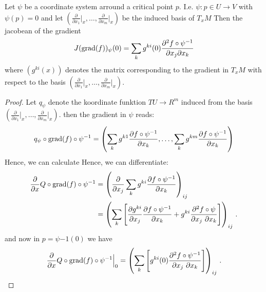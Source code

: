 \begin{lemma}
	Let $\psi$ be a coordinate system arround a critical point $p$. I.e. $\psi: p\in U\to V$ with $\psi(p)=0$ and let $\left( \frac{\partial}{\partial x_1}\big|_x,\dots ,\frac{\partial}{\partial x_m}\big|_x\right)$ be the induced basis of $T_xM$ Then the jacobean of the gradient 
	\begin{equation}
			J(\mathrm{grad}(f))_\psi(0)= \sum_{k}g^{ki}(0)\frac{\partial ^2 f\circ \psi^{-1} }{\partial x_j \partial x_k}
	\end{equation} where $(g^{ki}(x))$ denotes the matrix corresponding to the gradient in $T_xM$ with respect to the basis $\left( \frac{\partial}{\partial x_1}\big|_x,\dots ,\frac{\partial}{\partial x_m}\big|_x\right)$.
\end{lemma}
\begin{proof}
	Let $q_{\psi}$ denote the koordinate funktion $TU\to R^m$ induced from the basis $\left( \frac{\partial}{\partial x_1}\big|_x,\dots ,\frac{\partial}{\partial x_m}\big|_x\right)$. then the gradient in $\psi$ reads:
	\begin{align*}
		q_{\psi}\circ \mathrm{grad}(f)\circ \psi^{-1}=\left(\sum_kg^{k1  }\frac{\partial f\circ \psi^{-1}	}{\partial x_k},\dots, \sum_kg^{k m }\frac{\partial f\circ \psi^{-1}	}{\partial x_k}\right)
	\end{align*} Hence, we can calculate 
	Hence, we can differentiate: 
	\begin{align*}
		\frac{\partial}{\partial x}  Q\circ \mathrm{grad}(f)\circ \psi^{-1}
		&= \left(\frac{\partial}{\partial x_j} \sum_k g^{ki}\frac{\partial f \circ \psi^{-1}}{\partial x_k}\right)_{ij} \\
		&= \left(\sum_k \left[ 
		\frac{\partial g^{ki}}{\partial x_j}\frac{\partial f \circ \psi^{-1}}{\partial x_k} +  g^{ki}\frac{\partial^2 f \circ \psi}{\partial x_j ~\partial x_k}
		\right]\right)_{ij} \, .
	\end{align*}
	and now in $p=\psi{-1}(0)$ we have
	\begin{align*}
		\frac{\partial}{\partial x}  Q\circ \mathrm{grad}(f)\circ \psi^{-1} \Big|_{0}=\left(\sum_k \left[ 
		g^{ki}(0)\frac{\partial^2 f \circ \psi^{-1}}{\partial x_j ~\partial x_k}
		\right]\right)_{ij} \, .
	\end{align*}
\end{proof}








